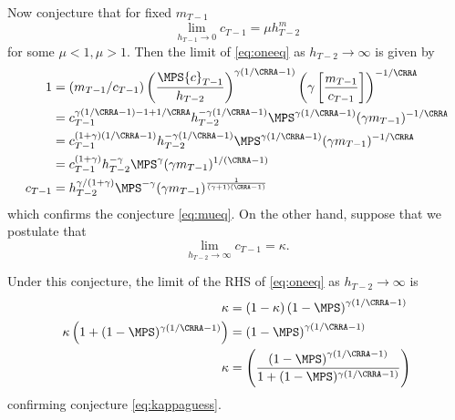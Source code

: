 \documentclass[titlepage]{\econtex}
\begin{document}
{  Now conjecture that for fixed ${m}_{T-1}$
  \begin{equation}
    \lim_{h_{T-1} \rightarrow 0} {c}_{T-1} = \mu h_{T-2}^{m}
    \label{eq:mueq}
  \end{equation}
  for some $\mu<1, \mu>1$.  Then the limit of \eqref{eq:oneeq} as $h_{T-2}
  \rightarrow \infty$ is given by
  \begin{equation*}\begin{gathered}\begin{aligned}
    1  & = ({m}_{T-1}/{c}_{T-1})\left(\frac{\MPS
            {c}_{T-1}}{h_{T-2}}\right)^{\gamma(1/\CRRA-1)}\left(\gamma
            \left[\frac{{m}_{T-1}}{{c}_{T-1}}\right]\right)^{-1/\CRRA}
    \\    
& =                 {c}_{T-1}^{\gamma(1/\CRRA-1)-1+1/\CRRA}h_{T-2}^{-\gamma(1/\CRRA-1)}\MPS^{\gamma(1/\CRRA-1)}(\gamma {m}_{T-1})^{-1/\CRRA}
    \\    
& =                 {c}_{T-1}^{(1+\gamma)(1/\CRRA-1)}h_{T-2}^{-\gamma(1/\CRRA-1)}\MPS^{\gamma(1/\CRRA-1)}(\gamma {m}_{T-1})^{-1/\CRRA}
    \\    
& =                 {c}_{T-1}^{(1+\gamma)}h_{T-2}^{-\gamma}\MPS^{\gamma}(\gamma {m}_{T-1})^{1/(\CRRA-1)}
    \\ {c}_{T-1}    & = h_{T-2}^{\gamma/(1+\gamma)}\MPS^{-\gamma}(\gamma
                         {m}_{T-1})^{\frac{1}{(\gamma+1)(\CRRA-1)}}
  \end{aligned}\end{gathered}\end{equation*}
  which confirms the conjecture \eqref{eq:mueq}.  On the other hand,
  suppose that we postulate that
  \begin{equation}
    \lim_{h_{T-2} \rightarrow \infty} {c}_{T-1} = \kappa.
    \label{eq:kappaguess}
  \end{equation}

  Under this conjecture, the limit of the RHS of \eqref{eq:oneeq} as
  $h_{T-2} \rightarrow \infty$ is
  \begin{equation*}\begin{gathered}\begin{aligned}
    \kappa 
& =                  (1-\kappa)\left(1-\MPS\right)^{\gamma(1/\CRRA-1)}
    \\      \kappa\left(1+(1-\MPS)^{\gamma(1/\CRRA-1)}\right)  & = \left(1-\MPS\right)^{\gamma(1/\CRRA-1)}
    \\      \kappa 
& =                          \left(\frac{\left(1-\MPS\right)^{\gamma(1/\CRRA-1)}}
                         {1+(1-\MPS)^{\gamma(1/\CRRA-1)}}\right)
  \end{aligned}\end{gathered}\end{equation*}
  confirming conjecture \eqref{eq:kappaguess}.

}
\end{document}
